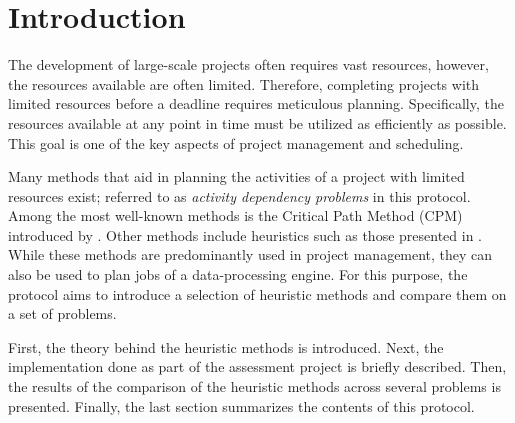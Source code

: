 \section{Introduction}
The development of large-scale projects often requires vast resources, however, the resources available are often limited.
Therefore, completing projects with limited resources before a deadline requires meticulous planning.
Specifically, the resources available at any point in time must be utilized as efficiently as possible.
This goal is one of the key aspects of project management and scheduling.

Many methods that aid in planning the activities of a project with limited resources exist; referred to as \textit{activity dependency problems} in this protocol.
Among the most well-known methods is the Critical Path Method (CPM) \cite{Kelley1959} introduced by \citeauthor{Kelley1959}.
Other methods include heuristics such as those presented in  \cite{Fiala2008}.
While these methods are predominantly used in project management, they can also be used to plan jobs of a data-processing engine.
For this purpose, the protocol aims to introduce a selection of heuristic methods and compare them on a set of problems.

First, the theory behind the heuristic methods is introduced.
Next, the implementation done as part of the assessment project is briefly described.
Then, the results of the comparison of the heuristic methods across several problems is presented.
Finally, the last section summarizes the contents of this protocol.
